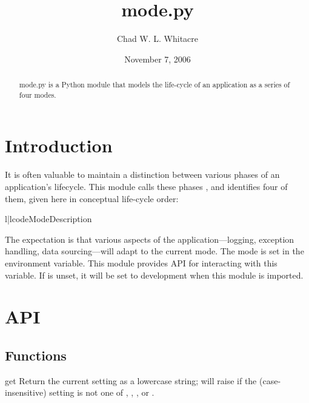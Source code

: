 \documentclass{manual}
\title{mode.py}
\author{Chad W. L. Whitacre}
\date{November 7, 2006} %
\begin{document}
\maketitle

\begin{abstract}

\noindent
mode.py is a Python module that models the life-cycle of an application as a
series of four modes.

\end{abstract}

\chapter{Introduction}

It is often valuable to maintain a distinction between various phases of an
application's lifecycle. This module calls these phases , and
identifies four of them, given here in conceptual life-cycle order:

\begin{tableii}{l|l}{code}{Mode}{Description}
\end{tableii}


The expectation is that various aspects of the application---logging, exception
handling, data sourcing---will adapt to the current mode. The mode is set in the
 environment variable. This module provides API for
interacting with this variable. If  is unset, it will be set
to development when this module is imported.

\chapter{API}

\section{Functions}

\begin{funcdesc}{get}{}
Return the current  setting as a lowercase string; will raise
 if the (case-insensitive) setting is not one of
, , , or .
\end{funcdesc}
\end{document}
